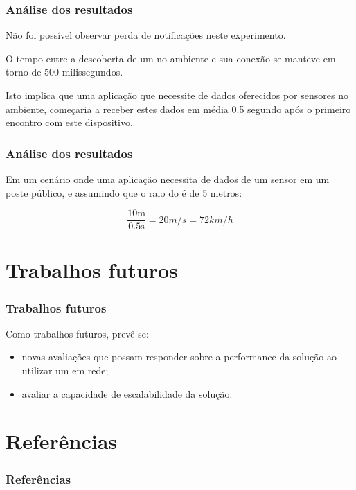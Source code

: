 \documentclass[aspectratio=169]{beamer}
\begin{document}
\begin{frame}
	\frametitle{Análise dos resultados}
	
	Não foi possível observar perda de notificações neste experimento.

	\bigskip
	
	O tempo entre a descoberta de um \smartobj no ambiente e sua conexão se manteve em torno de 500 milissegundos.

	\bigskip

	Isto implica que uma aplicação que necessite de dados oferecidos por sensores no ambiente, começaria a receber estes dados em média 0.5 segundo após o primeiro encontro com este dispositivo.

	\bigskip

\end{frame}

\begin{frame}
	\frametitle{Análise dos resultados}
	Em um cenário onde uma aplicação necessita de dados de um sensor em um poste público, e assumindo que o raio do \smartobj é de 5 metros:

	\[
		\frac{10\si{\meter}}{0.5\si{\second}} = 20\si{m/s} = 72\si{km/h}
	\]

\end{frame}


\section{Trabalhos futuros}


\begin{frame}
	\frametitle{Trabalhos futuros}
	Como trabalhos futuros, prevê-se:
	\begin{itemize}
		\item novas avaliações que possam responder sobre a performance da solução ao utilizar um \broker em rede;

		\item avaliar a capacidade de escalabilidade da solução.
	\end{itemize}
\end{frame}


\section{Referências}

\begin{frame}[allowframebreaks]
	\frametitle{Referências}
	
	
\end{frame}
\end{document}

